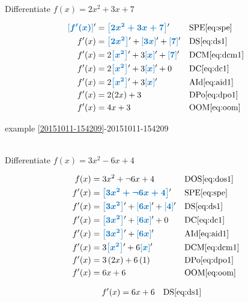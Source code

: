 \documentclass[20150903-160354-rs2.2-MarksMathNotebook.tex]{subfiles}
\begin{document}
\begin{example}[id:20151011-195002] \label{20151011-195002} \hfill \\
Differentiate $f(x)=2x^2+3x+7$

\soln

\solnsteps
\begin{align*}
\farg{f'(x)}' &= \farg{2x^2+3x+7}' && \text{SPE} \eqref{eq:spe} \\
f'(x) &= \farg{2x^2}'+\farg{3x}'+\farg{7}' && \text{DS} \eqref{eq:ds1} \\
f'(x) &= 2 \farg{x^2}' + 3\farg{x}' + \farg{7}' && \text{DCM} \eqref{eq:dcm1} \\
f'(x) &= 2 \farg{x^2}' + 3\farg{x}' + 0 && \text{DC} \eqref{eq:dc1} \\
f'(x) &= 2 \farg{x^2}' + 3\farg{x}' && \text{AId} \eqref{eq:aid1} \\
f'(x) &= 2(2x)+3 && \text{DPo} \eqref{eq:dpo1} \\
f'(x) &= 4x + 3 && \text{OOM} \eqref{eq:oom} 
\end{align*}

\qdepend

\qdependlist
example \ref{20151011-154209}-20151011-154209

\end{example}

\begin{example}[id:20141128-151834] \label{20141128-151834} \hfill \\

Differentiate $f(x)=3x^2-6x+4$

\soln

\solnsteps
\begin{align*}
f(x) &= 3x^2 + \neg 6x + 4 && \text{DOS} \eqref{eq:dos1} \\
f'(x) &= \farg{3x^2 + \neg 6x + 4}' && \text{SPE} \eqref{eq:spe} \\
f'(x) &= \farg{3x^2}' + \farg{6x}' + \farg{4}' && \text{DS} \eqref{eq:ds1} \\
f'(x) &= \farg{3x^2}' + \farg{6x}' + 0 && \text{DC} \eqref{eq:dc1} \\
f'(x) &= \farg{3x^2}' + \farg{6x}' && \text{AId} \eqref{eq:aid1} \\
f'(x) &= 3\farg{x^2}' + 6\farg{x}' && \text{DCM} \eqref{eq:dcm1} \\
f'(x) &= 3 \left(2x \right) + 6 \left(1\right) && \text{DPo} \eqref{eq:dpo1} \\
f'(x) &= 6x+6 && \text{OOM} \eqref{eq:oom}
\end{align*}

\soln
\lesssteps
\begin{align*}
f'(x) & = 6x+6 && \text{DS} \eqref{eq:ds1}
\end{align*}
\end{example}
\end{document}

